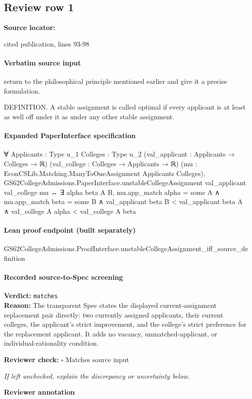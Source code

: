 \documentclass[10pt]{article}
\newcommand{\reviewerbox}{%
  \par\noindent\fbox{\parbox{0.96\linewidth}{\rule{0pt}{0.38in}}}\par
}
\newcommand{\reviewmatch}[1]{%
  \par\noindent\textbf{Reviewer check:} $\square$\; #1\par
  \noindent\emph{If left unchecked, explain the discrepancy or uncertainty below.}\par
}
\begin{document}
\subsection*{Review row 1}
\textbf{Source locator:} {\footnotesize\raggedright cited publication, lines 93-\allowbreak{}98\par}
\paragraph{Verbatim source input}
\begin{ReviewVerbatim}
return to the philosophical principle mentioned earlier and give it a precise
formulation.

   DEFINITION. A stable assignment is called optimal if every applicant is at least
as well off under it as under any other stable assignment.
\end{ReviewVerbatim}


\paragraph{Expanded PaperInterface specification}
\begin{ReviewVerbatim}
∀ {Applicants : Type u_1} {Colleges : Type u_2} (val_applicant : Applicants → Colleges → ℝ)
  (val_college : Colleges → Applicants → ℝ) (mu : EconCSLib.Matching.ManyToOneAssignment Applicants Colleges),
  GS62CollegeAdmissions.PaperInterface.unstableCollegeAssignment val_applicant val_college mu ↔
    ∃ alpha beta A B,
      mu.app_match alpha = some A ∧
        mu.app_match beta = some B ∧
          val_applicant beta B < val_applicant beta A ∧ val_college A alpha < val_college A beta
\end{ReviewVerbatim}

\paragraph{Lean proof endpoint (built separately)}\begin{ReviewVerbatim}
GS62CollegeAdmissions.ProofInterface.unstableCollegeAssignment_iff_source_definition
\end{ReviewVerbatim}

\paragraph{Recorded source-to-Spec screening}
\textbf{Verdict:} \texttt{matches}
\\
\textbf{Reason:} The transparent Spec states the displayed current-assignment replacement pair directly: two currently assigned applicants, their current colleges, the applicant's strict improvement, and the college's strict preference for the replacement applicant. It adds no vacancy, unmatched-applicant, or individual-rationality condition.
\reviewmatch{Matches source input}
\noindent\textbf{Reviewer annotation}\par
\reviewerbox
\clearpage
\hypertarget{source-claim-bdf5e4a40e708c9e}{}
\end{document}

